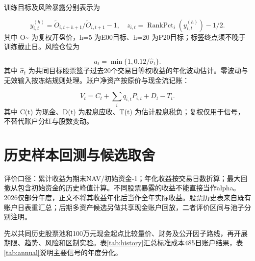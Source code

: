 \documentclass[12pt]{article}
\begin{document}
训练目标及风险暴露分别表示为

\begin{equation}y_{i,t}^{(h)}=\widetilde O_{i,t+h+1}/\widetilde O_{i,t+1}-1,\quad z_{i,t}=\operatorname{RankPct}_i(y_{i,t}^{(h)})-1/2.\end{equation}
其中 O\textasciitilde{} 为复权开盘价，h=5 为E00目标、h=20 为P20目标；标签终点须不晚于训练截止日。风险仓位为

\begin{equation}a_t=\min\{1,0.12/\widehat\sigma_t\}.\end{equation}
其中 $\widehat{\sigma}_t$ 为共同目标股票篮子过去20个交易日等权收益的年化波动估计。零波动与无效输入按冻结规则处理。账户净资产按原价与现金流记账：

\begin{equation}V_t=C_t+\sum_i q_{i,t}P_{i,t}+D_t-T_t.\end{equation}
其中 C(t) 为现金、D(t) 为股息应收、T(t) 为估计股息税负；复权仅用于信号，不替代账户分红与股数变动。


\section{历史样本回测与候选取舍}
评价口径：累计收益为期末NAV/初始资金-1；年化收益按交易日数折算；最大回撤从包含初始资金的历史峰值计算。不同股票暴露的收益不能直接当作alpha。2026仅部分年度，正文不将其收益年化后当作全年实际收益。股票历史表来自既有账户日表重汇总；后期多资产候选另做共享现金账户回放，二者评价区间与池子分别注明。

先以共同历史股票池和100万元现金起点比较量价、财务及公开因子路线，再开展期限、趋势、风险和区制实验。表\ref{tab:history}汇总标准成本485日账户结果，表\ref{tab:annual}说明主要信号的年度分化。
\end{document}
